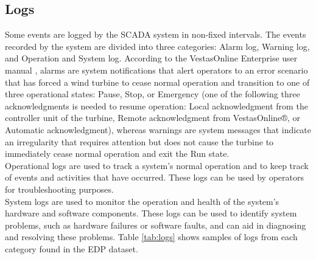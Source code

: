  \subsection{Logs}
  Some events are logged by the SCADA system in non-fixed intervals. The events recorded by the system are divided into three categories: Alarm log, 
  Warning log, and Operation and System log. According to the VestasOnline Enterprise user manual \cite{voe}, alarms are system notifications that alert operators to 
  an error scenario that has forced a wind turbine to cease normal operation and transition to one of three operational states: Pause, Stop, or 
  Emergency (one of the following three acknowledgments is needed to resume operation: Local acknowledgment 
  from the controller unit of the turbine, Remote acknowledgment from VestasOnline®, or Automatic acknowledgment), 
  whereas warnings are system messages that indicate an irregularity that requires attention but does not cause the turbine 
  to immediately cease normal operation and exit the Run state.\\
  Operational logs are used to track a system's normal operation and to keep track of events and activities that have occurred. 
  These logs can be used by operators for troubleshooting purposes.\\
  System logs are used to monitor the operation and health of the system's hardware and software components. 
  These logs can be used to identify system problems, such as hardware failures or software faults, and can aid in diagnosing and resolving these problems.
  Table \ref{tab:logs} shows samples of logs from each category found in the EDP dataset.


